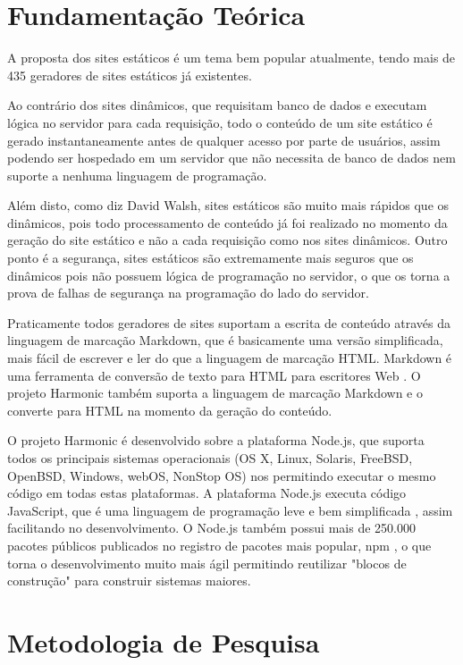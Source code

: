 \documentclass[ppginf, pep]{esinucpel}
\begin{document}
\chapter{Fundamentação Teórica}

A proposta dos sites estáticos é um tema bem popular atualmente, tendo mais de 435 geradores de sites estáticos já existentes. \cite{staticsitegenerators}

Ao contrário dos sites dinâmicos, que requisitam banco de dados e executam lógica no servidor para cada requisição, todo o conteúdo de um site estático é gerado instantaneamente antes de qualquer acesso por parte de usuários, assim podendo ser hospedado em um servidor que não necessita de banco de dados nem suporte a nenhuma linguagem de programação.

Além disto, como diz David Walsh, sites estáticos são muito mais rápidos que os dinâmicos, pois todo processamento de conteúdo já foi realizado no momento da geração do site estático e não a cada requisição como nos sites dinâmicos. Outro ponto é a segurança, sites estáticos são extremamente mais seguros que os dinâmicos pois não possuem lógica de programação no servidor, o que os torna a prova de falhas de segurança na programação do lado do servidor. \cite{dwb}

Praticamente todos geradores de sites suportam a escrita de conteúdo através da linguagem de marcação Markdown, que é basicamente uma versão simplificada, mais fácil de escrever e ler do que a linguagem de marcação HTML. Markdown é uma ferramenta de conversão de texto para HTML para escritores Web  \cite{markdown}. O projeto Harmonic também suporta a linguagem de marcação Markdown e o converte para HTML na momento da geração do conteúdo.

O projeto Harmonic é desenvolvido sobre a plataforma Node.js, que suporta todos os principais sistemas operacionais (OS X, Linux, Solaris, FreeBSD, OpenBSD, Windows, webOS, NonStop OS) nos permitindo executar o mesmo código em todas estas plataformas. A plataforma Node.js executa código JavaScript, que é uma linguagem de programação leve e bem simplificada \cite{mdn_js_intro}, assim facilitando no desenvolvimento. O Node.js também possui mais de 250.000 pacotes públicos publicados no registro de pacotes mais popular, npm \cite{npm}, o que torna o desenvolvimento muito mais ágil permitindo reutilizar "blocos de construção" para construir sistemas maiores. \cite{micromodules}

\chapter{Metodologia de Pesquisa}
\end{document}
